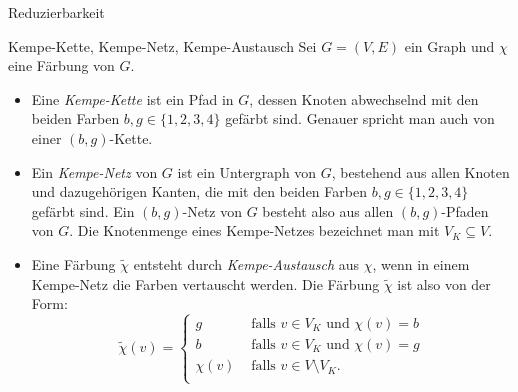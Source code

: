 \begin{section}{Reduzierbarkeit}
 \begin{definition}{Kempe-Kette, Kempe-Netz, Kempe-Austausch}
  Sei $G = (V,E)$ ein Graph und $\chi$ eine Färbung von $G$.
  \begin{itemize}
   \item Eine \textit{Kempe-Kette} ist ein Pfad in $G$, dessen Knoten abwechselnd mit den beiden Farben $b,g \in \{1,2,3,4\}$ gefärbt sind. Genauer spricht man auch von einer $(b,g)$-Kette.
   \item Ein \textit{Kempe-Netz} von $G$ ist ein Untergraph von $G$, bestehend aus allen Knoten und dazugehörigen Kanten, die mit den beiden Farben $b,g \in \{1,2,3,4\}$ gefärbt sind. Ein $(b,g)$-Netz von $G$ besteht also aus allen $(b,g)$-Pfaden von $G$. Die Knotenmenge eines Kempe-Netzes bezeichnet man mit $V_K\subseteq V$.
   \item Eine Färbung $\tilde{\chi}$ entsteht durch \textit{Kempe-Austausch} aus $\chi$, wenn in einem Kempe-Netz die Farben vertauscht werden. Die Färbung $\tilde{\chi}$ ist also von der Form:
   \[ \tilde{\chi}(v) = \begin{cases}
                        g &\text{ falls } v\in V_K \text{ und } \chi(v) = b\\
                        b &\text{ falls } v\in V_K \text{ und } \chi(v) = g\\
                        \chi(v) &\text{ falls } v\in V\setminus V_K\text{.} \\
                       \end{cases} \]
  \end{itemize}
 \end{definition}
 

\end{section}

